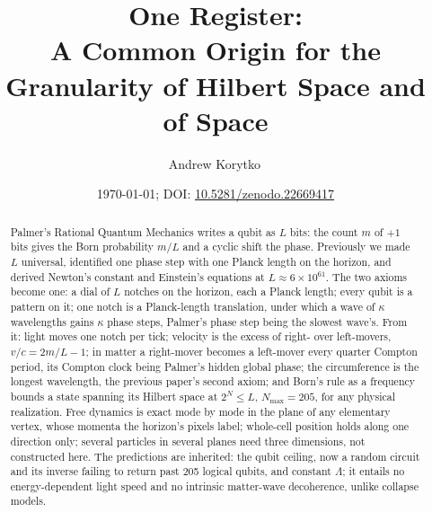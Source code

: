 \documentclass[aps,prd,twocolumn,superscriptaddress,nofootinbib]{revtex4-2}
\begin{document}
\title{One Register:\\ A Common Origin for the Granularity of Hilbert Space and of Space}

\author{Andrew Korytko\,}

\date{\today; DOI: \href{https://doi.org/10.5281/zenodo.22669417}{10.5281/zenodo.22669417}}

\begin{abstract}
Palmer's Rational Quantum Mechanics writes a qubit as $L$ bits: the count $m$ of $+1$ bits gives the Born probability $m/L$ and a cyclic shift the phase. Previously we made $L$ universal, identified one phase step with one Planck length on the horizon, and derived Newton's constant and Einstein's equations at $L \approx 6\times10^{61}$. The two axioms become one: a dial of $L$ notches on the horizon, each a Planck length; every qubit is a pattern on it; one notch is a Planck-length translation, under which a wave of $\kappa$ wavelengths gains $\kappa$ phase steps, Palmer's phase step being the slowest wave's. From it: light moves one notch per tick; velocity is the excess of right- over left-movers, $v/c = 2m/L - 1$; in matter a right-mover becomes a left-mover every quarter Compton period, its Compton clock being Palmer's hidden global phase; the circumference is the longest wavelength, the previous paper's second axiom; and Born's rule as a frequency bounds a state spanning its Hilbert space at $2^N \le L$, $N_{\max} = 205$, for any physical realization. Free dynamics is exact mode by mode in the plane of any elementary vertex, whose momenta the horizon's pixels label; whole-cell position holds along one direction only; several particles in several planes need three dimensions, not constructed here. The predictions are inherited: the qubit ceiling, now a random circuit and its inverse failing to return past 205 logical qubits, and constant $\Lambda$; it entails no energy-dependent light speed and no intrinsic matter-wave decoherence, unlike collapse models.
\end{abstract}


\maketitle
\end{document}
